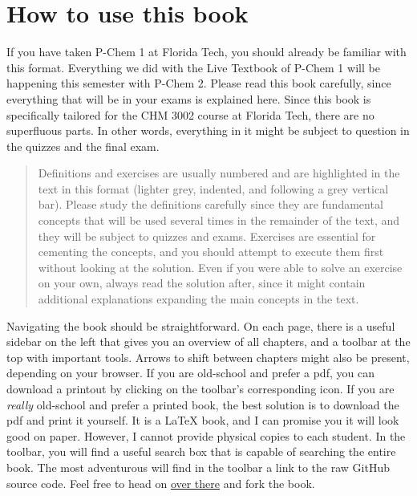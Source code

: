 \documentclass[
  english,
  9pt,
]{extbook}
\theoremstyle{definition}
\theoremstyle{definition}
\theoremstyle{definition}
\theoremstyle{definition}
\theoremstyle{remark}
\begin{document}
\section*{How to use this book}\label{how-to-use-this-book}

If you have taken P-Chem 1 at Florida Tech, you should already be familiar with this format. Everything we did with the Live Textbook of P-Chem 1 will be happening this semester with P-Chem 2. Please read this book carefully, since everything that will be in your exams is explained here.
Since this book is specifically tailored for the CHM 3002 course at Florida Tech, there are no superfluous parts. In other words, everything in it might be subject to question in the quizzes and the final exam.

\begin{quote}
Definitions and exercises are usually numbered and are highlighted in the text in this format (lighter grey, indented, and following a grey vertical bar). Please study the definitions carefully since they are fundamental concepts that will be used several times in the remainder of the text, and they will be subject to quizzes and exams. Exercises are essential for cementing the concepts, and you should attempt to execute them first without looking at the solution. Even if you were able to solve an exercise on your own, always read the solution after, since it might contain additional explanations expanding the main concepts in the text.
\end{quote}

Navigating the book should be straightforward. On each page, there is a useful sidebar on the left that gives you an overview of all chapters, and a toolbar at the top with important tools. Arrows to shift between chapters might also be present, depending on your browser. If you are old-school and prefer a pdf, you can download a printout by clicking on the toolbar's corresponding icon. If you are \emph{really} old-school and prefer a printed book, the best solution is to download the pdf and print it yourself. It is a LaTeX book, and I can promise you it will look good on paper. However, I cannot provide physical copies to each student. In the toolbar, you will find a useful search box that is capable of searching the entire book. The most adventurous will find in the toolbar a link to the raw GitHub source code. Feel free to head on \href{https://github.com/peverati/PChem2}{over there} and fork the book.
\end{document}
